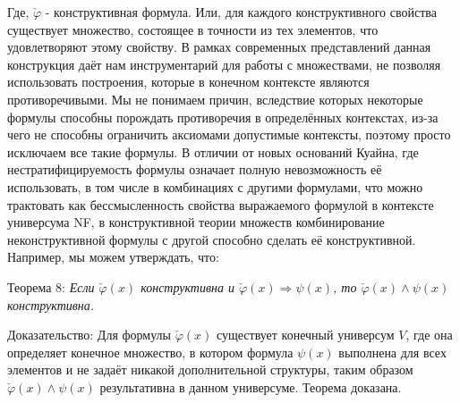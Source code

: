 \documentclass[12pt]{article}
\begin{document}
Где, $\check{\varphi}$ - конструктивная формула. Или, для каждого конструктивного свойства существует множество, состоящее в точности из тех элементов, что удовлетворяют этому свойству. В рамках современных представлений данная конструкция даёт нам инструментарий для работы с множествами, не позволяя использовать построения, которые в конечном контексте являются противоречивыми. Мы не понимаем причин, вследствие которых некоторые формулы способны порождать противоречия в определённых контекстах, из-за чего не способны ограничить аксиомами допустимые контексты, поэтому просто исключаем все такие формулы. В отличии от новых оснований Куайна, где нестратифицируемость формулы означает полную невозможность её использовать, в том числе в комбинациях с другими формулами, что можно трактовать как бессмысленность свойства выражаемого формулой в контексте универсума NF, в конструктивной теории множеств комбинирование неконструктивной формулы с другой способно сделать её конструктивной. Например, мы можем утверждать, что:

Теорема 8: {\sl Если $\check{\varphi}(x)$ конструктивна и $\check{\varphi}(x) \Rightarrow \psi(x)$, то $\check{\varphi}(x) \wedge \psi(x)$ конструктивна.}

Доказательство: 
Для формулы $\check{\varphi}(x)$ существует конечный универсум $V$, где она определяет конечное множество, в котором формула $\psi(x)$ выполнена для всех элементов и не задаёт никакой дополнительной структуры, таким образом $\check{\varphi}(x) \wedge \psi(x)$ результативна в данном универсуме. Теорема доказана.
\end{document}
